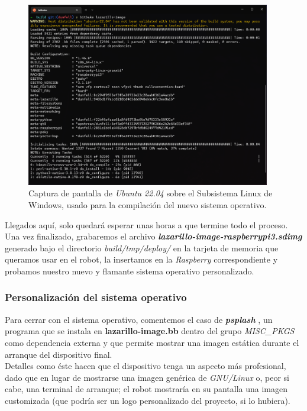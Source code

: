\begin{figure}[h]
	\centering
	\includegraphics[width=0.95\textwidth]{imagenes/lazarillo-image-compilation.png}
	\caption{Captura de pantalla de \textit{Ubuntu 22.04} sobre el Subsistema Linux de Windows, usado para la compilación del nuevo sistema operativo.}
\end{figure}

Llegados aquí, solo quedará esperar unas horas a que termine todo el proceso. Una vez finalizado, grabaremos el archivo \textbf{\textit{lazarillo-image-raspberrypi3.sdimg}} generado bajo el directorio \emph{build/tmp/deploy/} en la tarjeta de memoria que queramos usar en el robot, la insertamos en la \textit{Raspberry} correspondiente y probamos nuestro nuevo y flamante sistema operativo personalizado.\\


\subsubsection{Personalización del sistema operativo}

Para cerrar con el sistema operativo, comentemos el caso de \textbf{\textit{psplash}} \cite{psplash}, un programa que se instala en \textbf{lazarillo-image.bb} dentro del grupo \emph{MISC\_PKGS} como dependencia externa y que permite mostrar una imagen estática durante el arranque del dispositivo final.\\

Detalles como éste hacen que el dispositivo tenga un aspecto más profesional, dado que en lugar de mostrarse una imagen genérica de \textit{GNU/Linux} o, peor si cabe, una terminal de arranque; el robot mostraría en su pantalla una imagen customizada (que podría ser un logo personalizado del proyecto, si lo hubiera).\\

